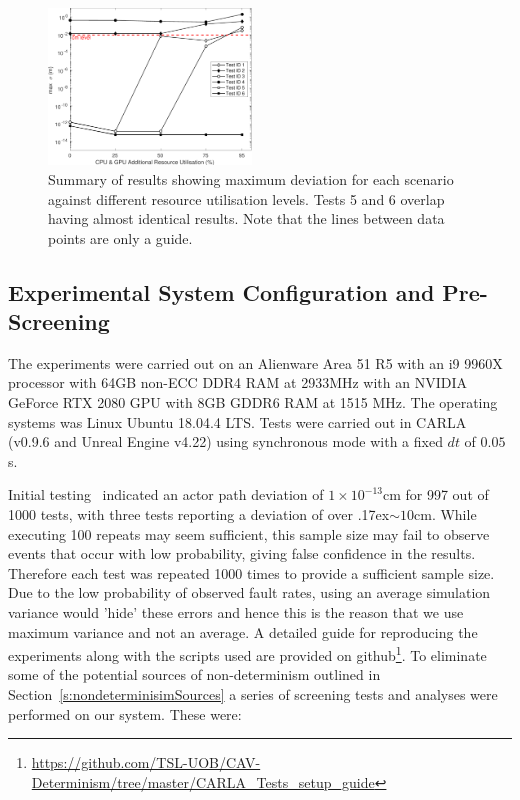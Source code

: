 \begin{figure}[t]
    \centering
    \includegraphics[width=0.48\textwidth]{../other/figures/ExperimentsStressSummaryV6.pdf}
    \caption{Summary of results showing maximum deviation for each scenario against different resource utilisation levels. Tests 5 and 6 overlap having almost identical results. Note that the lines between data points are only a guide.}
    \label{ExperimentsStressSummary}
\end{figure}
  
\subsection{Experimental System Configuration and Pre-Screening}\label{s:screening}
The experiments were carried out on an Alienware Area 51 R5 with an i9 9960X processor with 64GB non-ECC DDR4 RAM at 2933MHz with an NVIDIA GeForce RTX 2080 GPU with 8GB GDDR6 RAM at 1515 MHz. The operating systems was Linux Ubuntu 18.04.4 LTS. Tests were carried out in CARLA (v0.9.6 and Unreal Engine v4.22) using synchronous mode with a fixed $dt$ of $0.05$s. 

Initial testing~\cite{TSLUnrealEngineTesting} indicated an actor path deviation of $1\times10^{-13}$cm for 997 out of 1000 tests, with three tests reporting a deviation of over {\raise.17ex\hbox{$\scriptstyle\sim$}}$10$cm. While executing 100 repeats may seem sufficient, this sample size may fail to observe events that occur with low probability, giving false confidence in the results. Therefore each test was repeated 1000 times to provide a sufficient sample size. 
%
Due to the low probability of observed fault rates, using an average simulation variance would 'hide' these errors and hence this is the reason that we use maximum variance and not an average. 
%
A detailed guide for reproducing the experiments along with the scripts used are provided on github\footnote{\url{https://github.com/TSL-UOB/CAV-Determinism/tree/master/CARLA_Tests_setup_guide}}. To eliminate some of the potential sources of non-determinism outlined in Section~\ref{s:nondeterminisimSources} a series of screening tests and analyses were performed on our system. These were:

